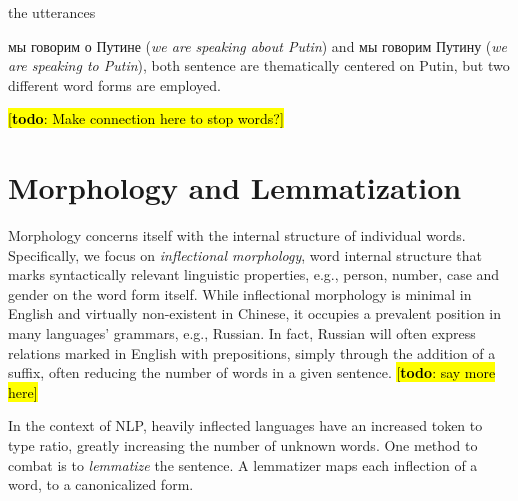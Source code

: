\documentclass[11pt,letterpaper]{article}
\newcommand{\Note}[3]{\sethlcolor{#2}\hl{[\textbf{#1}: #3]}}
\newcommand{\todo}[1]{\Note{todo}{lightred}{#1}}
\begin{document}
the utterances {{мы говорим о Путине} ({\em we
    are speaking about Putin}) and {{мы
      говорим Путину} ({\em we are speaking to Putin})}, both sentence
  are thematically centered on Putin, but two different word forms
  are employed.

  \todo{Make connection here to stop words?}


\section{Morphology and Lemmatization}\label{sec:inflectional}

Morphology concerns itself with the internal structure of individual
words.  Specifically, we focus on {\em inflectional morphology}, word
internal structure that marks syntactically relevant linguistic
properties, e.g., person, number, case and gender on the word form
itself. While inflectional morphology is minimal in English and
virtually non-existent in Chinese, it occupies a prevalent position in
many languages' grammars, e.g., Russian. In fact, Russian will often
express relations marked in English with prepositions, simply through
the addition of a suffix, often reducing the number of words in a
given sentence.  \todo{say more here}

In the context of NLP, heavily inflected languages have an
increased token to type ratio, greatly increasing the number of
unknown words. One method to combat is to {\em lemmatize} the sentence.
A lemmatizer maps each inflection of a word, to a canonicalized form. 


}
\end{document}
